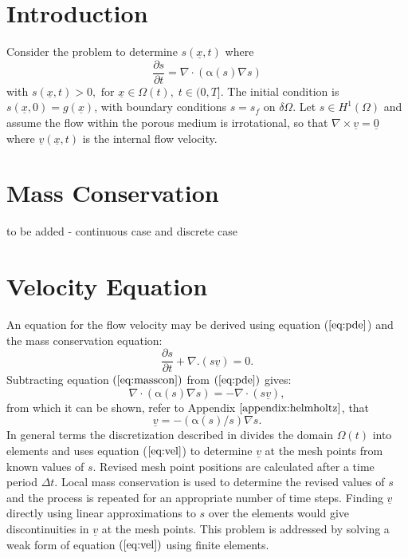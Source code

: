 \documentclass[11pt]{article}
\newcommand{\pl}{\partial}
\newcommand{\D}{\Delta}
\newcommand{\ul}{\underline}
\newcommand{\Om}{\Omega}
\newcommand{\al}{\mathrm{\alpha}}
\begin{document}
\section{Introduction}
Consider the problem to determine $s(\underline{x},t)$ where
\begin{equation}
\label{eq:pde}
\frac{\partial{s}}{\partial{t}} = \nabla\cdot\left(\al(s)\nabla{s}\right) 
\end{equation}
with $ s(\underline{x},t)>0, \text{ for } \underline{x} \in \Omega{(t)}, \;t\in(0,T]$. The initial condition is $s(\ul{x},0) = g(\ul{x})$, with boundary conditions $s=s_f$ on $\delta{\Omega}$.  Let $s \in H^{1}(\Omega)$ and assume the flow within the porous medium is irrotational, so that $\nabla\times\underline{v} = \underline{0}$ where $\underline{v}(\ul{x},t)$ is the internal flow velocity. \\
\section{Mass Conservation}
to be added - continuous case and discrete case
\section{Velocity Equation}
An equation for the flow velocity may be derived using equation ($\ref{eq:pde}$) and the mass conservation equation:
\begin{equation}
\label{eq:masscon}
\frac{\pl{s} }{\pl{t} } + \nabla.(s\underline{v}) =0.
\end{equation}
Subtracting equation $(\ref{eq:masscon})$ from $(\ref{eq:pde})$ gives:
\begin{equation}
\label{eq:vel0}
\nabla\cdot\left(\al(s)\nabla{s}\right) = - \nabla\cdot(s\underline{v}),
\end{equation}
from which it can be shown, refer to Appendix $\ref{appendix:helmholtz}$, that
\begin{equation}
\label{eq:vel}
\underline{v} =  -\left(\al(s)/s\right)\nabla{s}.
\end{equation}
In general terms the discretization described in \cite{Baines2011} divides the domain $\Om(t)$ into elements and uses equation ($\ref{eq:vel}$) to determine $\ul{v}$ at the mesh points from known values of $s$. Revised mesh point positions are calculated after a time period $\D{t}$. Local mass conservation is used to determine the revised values of $s$ and the process is repeated for an appropriate number of time steps. Finding $\ul{v}$ directly using linear approximations to $s$ over the elements would give discontinuities in $\ul{v}$ at the mesh points. This problem is addressed by solving a weak form of equation $(\ref{eq:vel})$ using finite elements.
\end{document}
